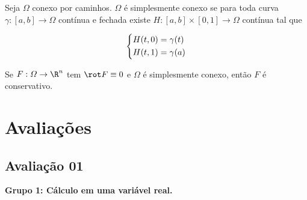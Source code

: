\documentclass[11pt, oneside, a4paper]{gsm-l}
\begin{document}
\begin{defi}
Seja $\varOmega$ conexo por caminhos. $\varOmega$ é simplesmente conexo se para toda curva $\gamma:[a,b] \to \varOmega$ contínua e fechada existe $H:[a,b] \times [0,1] \to \varOmega$ contínua tal que

\[
\left\{ \begin{gathered}
  H(t,0) = \gamma (t) \hfill \\
  H(t,1) = \gamma (a) \hfill \\ 
\end{gathered}  \right.
\]

\end{defi}

\begin{teo}
Se $F:\varOmega \to \R^n$ tem $\rot F \equiv 0$ e $\varOmega$ é simplesmente conexo, então $F$ é conservativo.
\end{teo}

\appendix
\chapter{Avalia\c{c}ões} \label{chapAv}

\section{Avalia\c{c}ão 01} \label{secP1}

\textbf{Grupo 1: Cálculo em uma variável real.}
\end{document}
